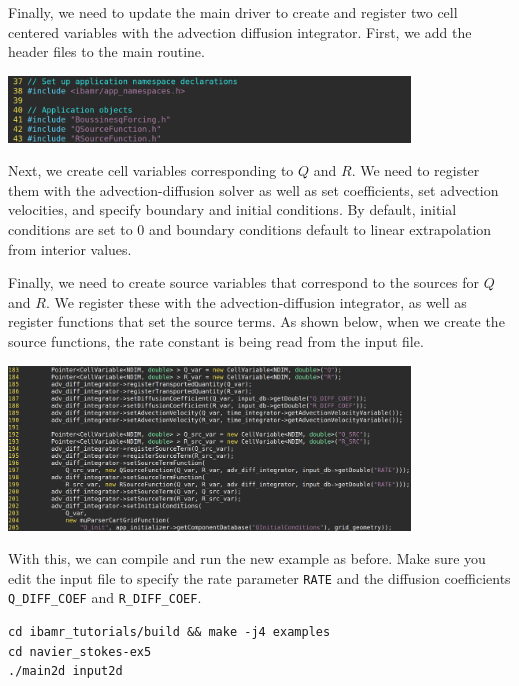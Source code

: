 \documentclass{article}
\begin{document}
Finally, we need to update the main driver to create and register two cell centered variables with the advection diffusion integrator. First, we add the header files to the main routine.
\begin{center}
\includegraphics[width=0.8\textwidth]{Graphs/NS-ex5/add_src/main_add_headers.png}
\end{center}

Next, we create cell variables corresponding to $Q$ and $R$. We need to register them with the advection-diffusion solver as well as set coefficients, set advection velocities, and specify boundary and initial conditions. By default, initial conditions are set to 0 and boundary conditions default to linear extrapolation from interior values.

Finally, we need to create source variables that correspond to the sources for $Q$ and $R$. We register these with the advection-diffusion integrator, as well as register functions that set the source terms. As shown below, when we create the source functions, the rate constant is being read from the input file.

\begin{center}
\includegraphics[width=0.8\textwidth]{Graphs/NS-ex5/add_src/main_add_sources.png}
\end{center}

With this, we can compile and run the new example as before. Make sure you edit the input file to specify the rate parameter \verb|RATE| and the diffusion coefficients \verb|Q_DIFF_COEF| and \verb|R_DIFF_COEF|.
\begin{verbatim}
cd ibamr_tutorials/build && make -j4 examples
cd navier_stokes-ex5
./main2d input2d
\end{verbatim}
\end{document}

